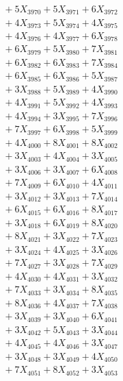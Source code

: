 \documentclass[a4paper,10pt]{article}
\begin{document}
{\begin{align}
&\;  + 5 X_{3970} + 5 X_{3971} + 6 X_{3972} \\[0.3ex]
&\;  + 4 X_{3973} + 5 X_{3974} + 4 X_{3975} \\[0.3ex]
&\;  + 4 X_{3976} + 4 X_{3977} + 6 X_{3978} \\[0.3ex]
&\;  + 6 X_{3979} + 5 X_{3980} + 7 X_{3981} \\[0.3ex]
&\;  + 6 X_{3982} + 6 X_{3983} + 7 X_{3984} \\[0.3ex]
&\;  + 6 X_{3985} + 6 X_{3986} + 5 X_{3987} \\[0.3ex]
&\;  + 3 X_{3988} + 5 X_{3989} + 4 X_{3990} \\[0.3ex]
&\;  + 4 X_{3991} + 5 X_{3992} + 4 X_{3993} \\[0.3ex]
&\;  + 4 X_{3994} + 3 X_{3995} + 7 X_{3996} \\[0.3ex]
&\;  + 7 X_{3997} + 6 X_{3998} + 5 X_{3999} \\[0.5ex]\allowbreak
&\;  + 4 X_{4000} + 8 X_{4001} + 8 X_{4002} \\[0.3ex]
&\;  + 3 X_{4003} + 4 X_{4004} + 3 X_{4005} \\[0.3ex]
&\;  + 3 X_{4006} + 3 X_{4007} + 6 X_{4008} \\[0.3ex]
&\;  + 7 X_{4009} + 6 X_{4010} + 4 X_{4011} \\[0.3ex]
&\;  + 3 X_{4012} + 3 X_{4013} + 7 X_{4014} \\[0.3ex]
&\;  + 6 X_{4015} + 6 X_{4016} + 8 X_{4017} \\[0.3ex]
&\;  + 3 X_{4018} + 6 X_{4019} + 8 X_{4020} \\[0.3ex]
&\;  + 8 X_{4021} + 3 X_{4022} + 7 X_{4023} \\[0.3ex]
&\;  + 3 X_{4024} + 4 X_{4025} + 3 X_{4026} \\[0.3ex]
&\;  + 7 X_{4027} + 3 X_{4028} + 7 X_{4029} \\[0.5ex]\allowbreak
&\;  + 4 X_{4030} + 4 X_{4031} + 3 X_{4032} \\[0.3ex]
&\;  + 7 X_{4033} + 3 X_{4034} + 8 X_{4035} \\[0.3ex]
&\;  + 8 X_{4036} + 4 X_{4037} + 7 X_{4038} \\[0.3ex]
&\;  + 3 X_{4039} + 3 X_{4040} + 6 X_{4041} \\[0.3ex]
&\;  + 3 X_{4042} + 5 X_{4043} + 3 X_{4044} \\[0.3ex]
&\;  + 4 X_{4045} + 4 X_{4046} + 3 X_{4047} \\[0.3ex]
&\;  + 3 X_{4048} + 3 X_{4049} + 4 X_{4050} \\[0.3ex]
&\;  + 7 X_{4051} + 8 X_{4052} + 3 X_{4053} \\[0.3ex]

\end{align}}
\end{document}
